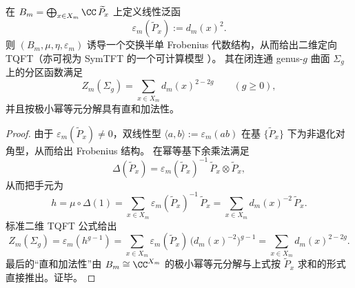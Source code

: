 \begin{theorem}\label{thm:conclusion-fold-symtft-partition-function-collision-moments}
在 \(B_m=\bigoplus_{x\in X_m}\CC\,\widetilde P_x\) 上定义线性泛函
\[
\varepsilon_m(\widetilde P_x):=d_m(x)^2.
\]
则 \((B_m,\mu,\eta,\varepsilon_m)\) 诱导一个交换半单 Frobenius 代数结构，从而给出二维定向 TQFT（亦可视为 SymTFT 的一个可计算模型 \cite{Bottini2025CategoricalSymmetriesQFT}）。
其在闭连通 genus-\(g\) 曲面 \(\Sigma_g\) 上的分区函数满足
\[
Z_m(\Sigma_g)=\sum_{x\in X_m} d_m(x)^{2-2g}\qquad(g\ge 0),
\]
并且按极小幂等元分解具有直和加法性。
\end{theorem}
\begin{proof}
由于 \(\varepsilon_m(\widetilde P_x)\neq 0\)，双线性型 \(\langle a,b\rangle:=\varepsilon_m(ab)\) 在基 \(\{\widetilde P_x\}\) 下为非退化对角型，从而给出 Frobenius 结构。
在幂等基下余乘法满足
\[
\Delta(\widetilde P_x)=\varepsilon_m(\widetilde P_x)^{-1}\,\widetilde P_x\otimes \widetilde P_x,
\]
从而把手元为
\[
h=\mu\circ\Delta(1)=\sum_{x\in X_m}\varepsilon_m(\widetilde P_x)^{-1}\,\widetilde P_x=\sum_{x\in X_m}d_m(x)^{-2}\,\widetilde P_x.
\]
标准二维 TQFT 公式给出
\[
Z_m(\Sigma_g)=\varepsilon_m(h^{g-1})
=\sum_{x\in X_m}\varepsilon_m(\widetilde P_x)\,\bigl(d_m(x)^{-2}\bigr)^{g-1}
=\sum_{x\in X_m}d_m(x)^{2-2g}.
\]
最后的“直和加法性”由 \(B_m\cong \CC^{X_m}\) 的极小幂等元分解与上式按 \(\widetilde P_x\) 求和的形式直接推出。证毕。
\end{proof}

